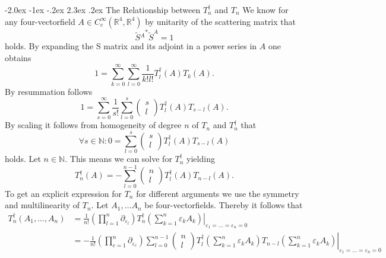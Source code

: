 \documentclass[oneside,reqno,12pt]{amsart}
\makeatletter
\renewcommand\section{\@startsection {section}{1}{\z@}%
                                   {-2.0ex \@plus -1ex \@minus -.2ex}%
                                   {2.3ex \@plus.2ex}%
                                   {\normalfont\Large\bfseries}}
\makeatother
\begin{document}
\section{The Relationship between \(T_n^\dagger\) and \(T_n\)}
We know for any four-vectorfield \(A\in C^\infty_c (\mathbb{R}^4,\mathbb{R}^4)\) by unitarity of the scattering matrix that
\begin{equation}
{\tilde{S}{}^A }^* {\tilde{S}}^A = 1
\end{equation}
holds. By expanding the S matrix and its adjoint in a power series in \(A\) one obtains
\begin{equation}
1 = \sum_{k=0}^\infty \sum_{l=0}^\infty \frac{1}{k! l !} T^\dagger_l(A) T_k(A).
\end{equation}
By resummation follows
\begin{equation}
1= \sum_{s=0}^\infty \frac{1}{s!} \sum_{l=0}^s \begin{pmatrix}s \\ l\end{pmatrix} T^\dagger_l (A) T_{s-l}(A).
\end{equation}
By scaling it follows from homogeneity of degree \(n\) of \(T_n\) and \(T^\dagger_n\) that
\begin{equation}
\forall s \in\mathbb{N}: 0=\sum_{l=0}^s \begin{pmatrix}s \\ l\end{pmatrix} T^\dagger_l (A) T_{s-l}(A)
\end{equation}
holds. Let \(n\in\mathbb{N}\). This means we can solve for \(T_n^\dagger\) yielding
\begin{equation}
T_n^\dagger (A)= - \sum_{l=0}^{n-1} \begin{pmatrix}n \\ l \end{pmatrix} T_l^\dagger(A) T_{n-l}(A).
\end{equation}
To get an explicit expression for \(T_n\) for different arguments we use the symmetry and multilinearity of \(T_n\). Let \(A_1,\dots A_n\) be four-vectorfields. Thereby it follows that
\begin{align*}
T_n^\dagger(A_1,\dots, A_n) 
&= \frac{1}{n!} \left(\prod_{l=1}^n \partial_{\varepsilon_l}\right)\left. T^\dagger_n \left(\sum_{k=1}^n\varepsilon_k A_k\right)\right|_{\varepsilon_1=\dots=\varepsilon_n=0}\\
&= - \frac{1}{n!} \left(\prod_{c=1}^n \partial_{\varepsilon_c}\right) \left. \sum_{l=0}^{n-1} \begin{pmatrix}n \\ l \end{pmatrix} T_l^\dagger \left(\sum_{k=1}^n\varepsilon_k A_k\right) T_{n-l} \left(\sum_{k=1}^n\varepsilon_k A_k\right) \right|_{\varepsilon_1=\dots=\varepsilon_n=0}
\end{align*}
\end{document}
